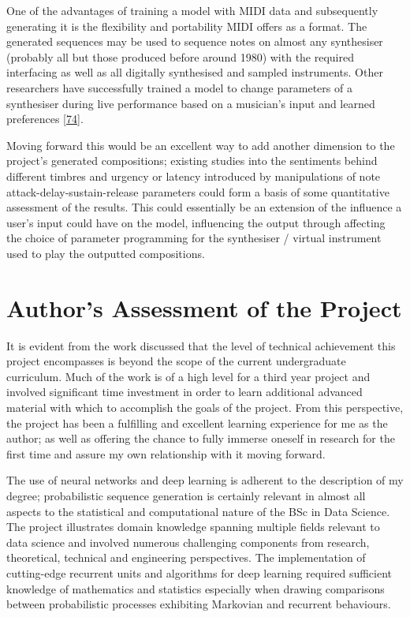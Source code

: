 \documentclass[12pt,]{article}
\begin{document}
One of the advantages of training a model with MIDI data and
subsequently generating it is the flexibility and portability MIDI
offers as a format. The generated sequences may be used to sequence
notes on almost any synthesiser (probably all but those produced before
around 1980) with the required interfacing as well as all digitally
synthesised and sampled instruments. Other researchers have successfully
trained a model to change parameters of a synthesiser during live
performance based on a musician's input and learned preferences
{[}\protect\hyperlink{ref-sommer2014towards}{74}{]}.

Moving forward this would be an excellent way to add another dimension
to the project's generated compositions; existing studies into the
sentiments behind different timbres and urgency or latency introduced by
manipulations of note attack-delay-sustain-release parameters could form
a basis of some quantitative assessment of the results. This could
essentially be an extension of the influence a user's input could have
on the model, influencing the output through affecting the choice of
parameter programming for the synthesiser / virtual instrument used to
play the outputted compositions.

\hypertarget{authors-assessment-of-the-project}{%
\section{Author's Assessment of the
Project}\label{authors-assessment-of-the-project}}

It is evident from the work discussed that the level of technical
achievement this project encompasses is beyond the scope of the current
undergraduate curriculum. Much of the work is of a high level for a
third year project and involved significant time investment in order to
learn additional advanced material with which to accomplish the goals of
the project. From this perspective, the project has been a fulfilling
and excellent learning experience for me as the author; as well as
offering the chance to fully immerse oneself in research for the first
time and assure my own relationship with it moving forward.

The use of neural networks and deep learning is adherent to the
description of my degree; probabilistic sequence generation is certainly
relevant in almost all aspects to the statistical and computational
nature of the BSc in Data Science. The project illustrates domain
knowledge spanning multiple fields relevant to data science and involved
numerous challenging components from research, theoretical, technical
and engineering perspectives. The implementation of cutting-edge
recurrent units and algorithms for deep learning required sufficient
knowledge of mathematics and statistics especially when drawing
comparisons between probabilistic processes exhibiting Markovian and
recurrent behaviours.
\end{document}
